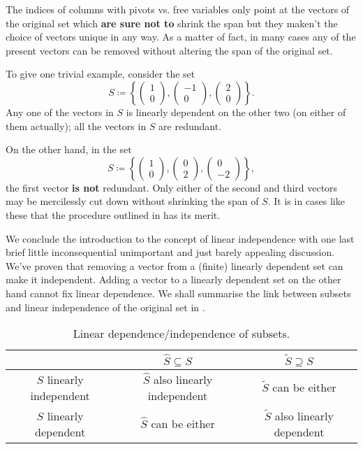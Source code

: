 \begin{warning}{}{}
 The indices of columns with pivots vs. free variables only point at the vectors
 of the original set which \textbf{are sure not to} shrink the span but they
 maken't the choice of vectors unique in any way. As a matter of fact, in many
 cases any of the present vectors can be removed without altering the span of
 the original set.

 To give one trivial example, consider the set
 \[
  S \coloneqq \left\{
   \begin{pmatrix}
    1\\0
   \end{pmatrix},
   \begin{pmatrix}
    -1\\
    0
   \end{pmatrix},
   \begin{pmatrix}
    2\\
    0
   \end{pmatrix}
  \right\}.
 \]
 Any one of the vectors in $S$ is linearly dependent on the other two (on either
 of them actually); all the vectors in $S$ are redundant.

 On the other hand, in the set
 \[
  S \coloneqq \left\{ 
   \begin{pmatrix}
    1\\
    0
   \end{pmatrix},
   \begin{pmatrix}
    0\\
    2
   \end{pmatrix},
   \begin{pmatrix}
    0\\
    -2
   \end{pmatrix}
  \right\},
 \]
 the first vector \textbf{is not} redundant. Only either of the second and third
 vectors may be mercilessly cut down without shrinking the span of $S$. It is in
 cases like these that the procedure outlined in
  has its merit.
\end{warning}

We conclude the introduction to the concept of linear independence with one last
brief little inconsequential unimportant and just barely appealing discussion.
We've proven that removing a vector from a (finite) linearly dependent set can
make it independent. Adding a vector to a linearly dependent set on the other
hand cannot fix linear dependence. We shall summarise the link between subsets
and linear independence of the original set in
.
\begin{table}[ht]
 \centering
 \begin{tabular}{c | c  c}
  & $\hat{S} \subseteq S$ & $\tilde{S} \supseteq S$ \\
  \toprule
  $S$ linearly independent & $\hat{S}$ also linearly independent & $\tilde{S}$
  can be either\\
  $S$ linearly dependent & $\hat{S}$ can be either & $\tilde{S}$ also linearly
  dependent 
 \end{tabular}
 \caption{Linear dependence/independence of subsets.}
 \label{table:linear-dependence-subsets}
\end{table}

